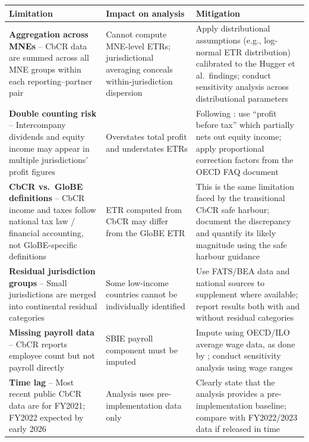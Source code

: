 \documentclass[12pt,a4paper]{article}
\begin{document}
\begin{longtable}{p{4cm}p{4.5cm}p{4.5cm}}
\toprule
\textbf{Limitation} & \textbf{Impact on analysis} & \textbf{Mitigation} \\
\midrule
\endhead
\textbf{Aggregation across MNEs} -- CbCR data are summed across all MNE groups within each reporting--partner pair &
Cannot compute MNE-level ETRs; jurisdictional averaging conceals within-jurisdiction dispersion \parencite{hugger2025} &
Apply distributional assumptions (e.g., log-normal ETR distribution) calibrated to the Hugger et al.\ findings; conduct sensitivity analysis across distributional parameters \\
\addlinespace

\textbf{Double counting risk} -- Intercompany dividends and equity income may appear in multiple jurisdictions' profit figures &
Overstates total profit and understates ETRs &
Following \textcite{torslov2022}: use ``profit before tax'' which partially nets out equity income; apply proportional correction factors from the OECD FAQ document \\
\addlinespace

\textbf{CbCR vs.\ GloBE definitions} -- CbCR income and taxes follow national tax law / financial accounting, not GloBE-specific definitions &
ETR computed from CbCR may differ from the GloBE ETR &
This is the same limitation faced by the transitional CbCR safe harbour; document the discrepancy and quantify its likely magnitude using the safe harbour guidance \\
\addlinespace

\textbf{Residual jurisdiction groups} -- Small jurisdictions are merged into continental residual categories &
Some low-income countries cannot be individually identified &
Use FATS/BEA data and national sources to supplement where available; report results both with and without residual categories \\
\addlinespace

\textbf{Missing payroll data} -- CbCR reports employee count but not payroll directly &
SBIE payroll component must be imputed &
Impute using OECD/ILO average wage data, as done by \textcite{devereux2023}; conduct sensitivity analysis using wage ranges \\
\addlinespace

\textbf{Time lag} -- Most recent public CbCR data are for FY2021; FY2022 expected by early 2026 &
Analysis uses pre-implementation data only &
Clearly state that the analysis provides a pre-implementation baseline; compare with FY2022/2023 data if released in time \\
\bottomrule
\end{longtable}
\end{document}
